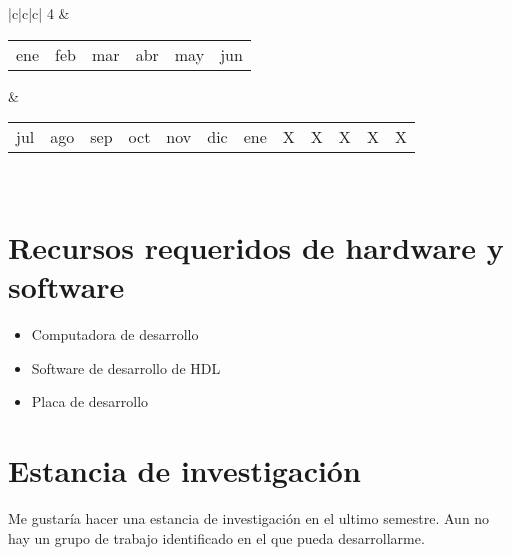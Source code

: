\documentclass[runningheads,a4paper]{llncs}
\begin{document}
\begin{table}
\begin{center}
\begin{tabular}{|c|c|c|}
4 & 
    \begin{tabular}{c|c|c|c|c|c}
        ene & feb & mar & abr & may & jun\\
    \end{tabular} &
    \begin{tabular}{c|c|c|c|c|c|c|c|c|c|c|c}
        jul & ago & sep & oct & nov & dic & ene & X & X & X & X & X\\
    \end{tabular}\\\hline

\end{tabular}
\end{center}
\end{table}

\section{Recursos requeridos de hardware y software}
\begin{itemize}
\item Computadora de desarrollo
\item Software de desarrollo de HDL
\item Placa de desarrollo
 \end{itemize}



\section{Estancia de investigación}
Me gustaría hacer una estancia de investigación en el ultimo semestre. Aun no hay un grupo de trabajo identificado en el que pueda desarrollarme. \\ 


\break
\end{document}
